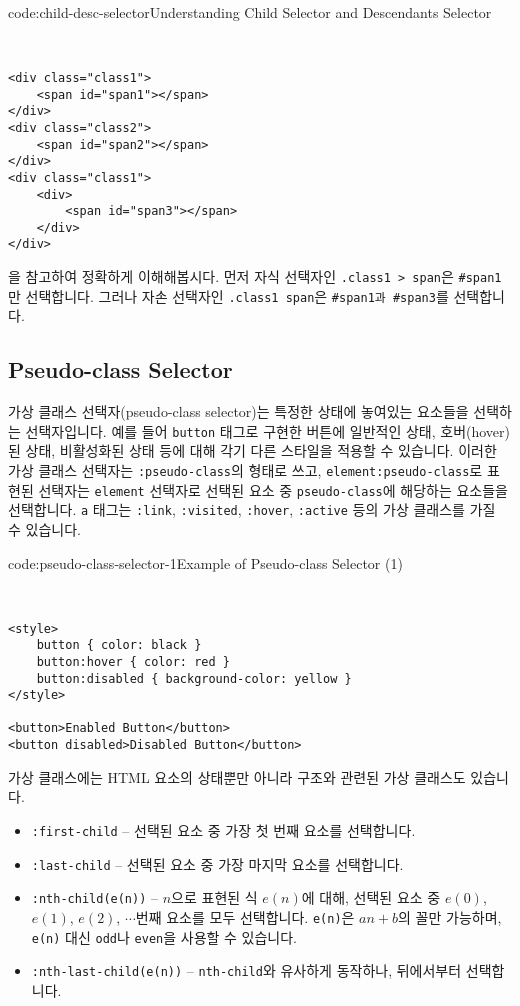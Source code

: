 \begin{codeenv}{code:child-desc-selector}{Understanding Child Selector and Descendants Selector}\begin{verbatim}


<div class="class1">
    <span id="span1"></span>
</div>
<div class="class2">
    <span id="span2"></span>
</div>
<div class="class1">
    <div>
        <span id="span3"></span>
    </div>
</div>
\end{verbatim}
\end{codeenv}

을 참고하여 정확하게 이해해봅시다. 먼저 자식 선택자인 \verb|.class1 > span|은 \verb|#span1|만 선택합니다. 그러나 자손 선택자인 \verb|.class1 span|은 \verb|#span1과 #span3|를 선택합니다. 

\subsection*{Pseudo-class Selector}
가상 클래스 선택자(pseudo-class selector)는 특정한 상태에 놓여있는 요소들을 선택하는 선택자입니다. 예를 들어 \verb|button| 태그로 구현한 버튼에 일반적인 상태, 호버(hover)된 상태, 비활성화된 상태 등에 대해 각기 다른 스타일을 적용할 수 있습니다. 이러한 가상 클래스 선택자는 \verb|:pseudo-class|의 형태로 쓰고, \verb|element:pseudo-class|로 표현된 선택자는 \verb|element| 선택자로 선택된 요소 중 \verb|pseudo-class|에 해당하는 요소들을 선택합니다. \verb|a| 태그는 \verb|:link|, \verb|:visited|, \verb|:hover|, \verb|:active| 등의 가상 클래스를 가질 수 있습니다. 

\begin{codeenv}{code:pseudo-class-selector-1}{Example of Pseudo-class Selector (1)}\begin{verbatim}


<style>
    button { color: black }
    button:hover { color: red }
    button:disabled { background-color: yellow }
</style>

<button>Enabled Button</button>
<button disabled>Disabled Button</button>
\end{verbatim}
\end{codeenv}

가상 클래스에는 HTML 요소의 상태뿐만 아니라 구조와 관련된 가상 클래스도 있습니다.

\begin{itemize}
    \item \verb|:first-child| – 선택된 요소 중 가장 첫 번째 요소를 선택합니다. 
    \item \verb|:last-child| – 선택된 요소 중 가장 마지막 요소를 선택합니다. 
    \item \verb|:nth-child(e(n))| – $n$으로 표현된 식 $e(n)$에 대해, 선택된 요소 중 $e(0)$, $e(1)$, $e(2)$, $\cdots$번째 요소를 모두 선택합니다. \verb|e(n)|은 $an+b$의 꼴만 가능하며, \verb|e(n)| 대신 \verb|odd|나 \verb|even|을 사용할 수 있습니다.
    \item \verb|:nth-last-child(e(n))| – \verb|nth-child|와 유사하게 동작하나, 뒤에서부터 선택합니다. 
\end{itemize}

